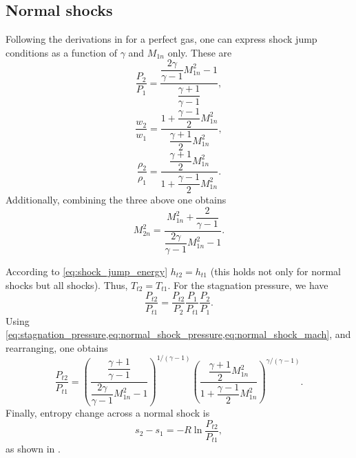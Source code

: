 \documentclass[oneside,a4paper,11pt]{report}
\begin{document}
\subsection{Normal shocks}
Following the derivations in \cite{thompson1988} for a perfect gas, one can express shock jump conditions as a function of $\gamma$ and $M_{1n}$ only. These are
\begin{equation}
\label{eq:normal_shock_pressure}
    \frac{P_2}{P_1} = \dfrac{\dfrac{2 \gamma}{\gamma - 1} M_{1n}^2 - 1}{\dfrac{\gamma + 1}{\gamma-1}},
\end{equation}
\begin{equation}
\label{eq:normal_shock_velocity}
    \frac{w_2}{w_1} = \dfrac{1 + \dfrac{\gamma - 1}{2} M_{1n}^2}{\dfrac{\gamma + 1}{2} M_{1n}^2},
\end{equation}
\begin{equation}
\label{eq:normal_shock_density}
    \frac{\rho_2}{\rho_1} = \dfrac{\dfrac{\gamma + 1}{2} M_{1n}^2}{1 + \dfrac{\gamma - 1}{2} M_{1n}^2}.
\end{equation}
Additionally, combining the three above one obtains
\begin{equation}
\label{eq:normal_shock_mach}
    M_{2n}^2 = \dfrac{M_{1n}^2 + \dfrac{2}{\gamma - 1}}{ \dfrac{2\gamma}{\gamma - 1}M_{1n}^2 - 1}.
\end{equation}

According to \cref{eq:shock_jump_energy} $h_{t2} = h_{t1}$ (this holds not only for normal shocks but all shocks). Thus, $T_{t2} = T_{t1}$. For the stagnation pressure, we have
\begin{equation}
\frac{P_{t2}}{P_{t1}} = \frac{P_{t2}}{P_2} \frac{P_1}{P_{t1}} \frac{P_2}{P_1}.
\end{equation}
Using \cref{eq:stagnation_pressure,eq:normal_shock_pressure,eq:normal_shock_mach}, and rearranging, one obtains
\begin{equation}
\label{eq:normal_shock_stagnation_pressure}
    \frac{P_{t2}}{P_{t1}} = \left ( \dfrac{ \dfrac{\gamma + 1}{\gamma - 1} }{ \dfrac{2 \gamma}{\gamma - 1} M_{1n}^2 - 1} \right) ^{ 1 / (\gamma - 1) } \left ( \dfrac{ \dfrac{\gamma + 1}{2} M_{1n}^2 }{ 1 + \dfrac{\gamma - 1}{2} M_{1n}^2 } \right ) ^{\gamma / (\gamma - 1)}.
\end{equation}
Finally, entropy change across a normal shock is
\begin{equation}
s_2 - s_1 = -R \ln \frac{P_{t2}}{P_{t1}},
\end{equation}
as shown in \cite{thompson1988}.
\end{document}
